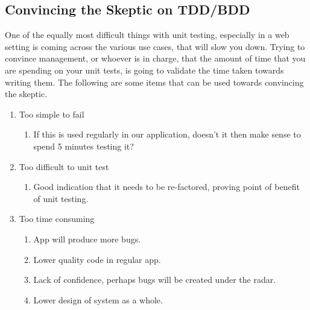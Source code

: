 \subsection{ Convincing the Skeptic on TDD/BDD }
One of the equally most difficult things with unit testing, especially in a web
setting is coming across the various use cases, that will slow you down. Trying
to convince management, or whoever is in charge, that the amount of time that
you are spending on your unit tests, is going to validate the time taken towards
writing them. The following are some items that can be used towards convincing
the skeptic.
\begin{enumerate}
  \item Too simple to fail
    \begin{enumerate}
      \item If this is used regularly in our application, doesn't it then make
      sense to spend 5 minutes testing it?
    \end{enumerate}
  \item Too difficult to unit test
    \begin{enumerate}
      \item Good indication that it needs to be re-factored, proving point of
      benefit of unit testing.
    \end{enumerate}
  \item Too time consuming
    \begin{enumerate}
      \item App will produce more bugs.
      \item Lower quality code in regular app.
      \item Lack of confidence, perhaps bugs will be created under the radar.
      \item Lower design of system as a whole.
    \end{enumerate}
\end{enumerate}

